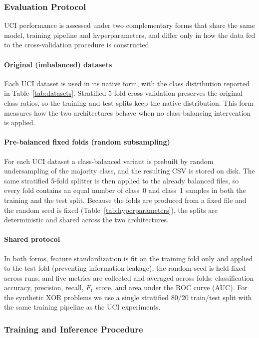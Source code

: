 \documentclass{ieeeaccess}
\begin{document}
\subsubsection{Evaluation Protocol}\label{sec:evalprotocol}

UCI performance is assessed under two complementary forms that share
the same model, training pipeline and hyperparameters, and differ only
in how the data fed to the cross-validation procedure is constructed.

\paragraph{Original (imbalanced) datasets} Each UCI dataset is used
in its native form, with the class distribution reported in
Table~\ref{tab:datasets}. Stratified 5-fold cross-validation preserves the
original class ratios, so the training and test splits keep the native
distribution. This form measures how the two architectures behave
when no class-balancing intervention is applied.

\paragraph{Pre-balanced fixed folds (random subsampling)} For each UCI
dataset a class-balanced variant is prebuilt by random undersampling
of the majority class, and the resulting CSV is stored on disk. The
same stratified 5-fold splitter is then applied to the already balanced
files, so every fold contains an equal number of class~0 and class~1
samples in both the training and the test split. Because the folds are
produced from a fixed file and the random seed is fixed
(Table~\ref{tab:hyperparameters}), the splits are deterministic and
shared across the two architectures.

\paragraph{Shared protocol} In both forms, feature standardization is
fit on the training fold only and applied to the test fold (preventing
information leakage), the random seed is held fixed across runs, and
five metrics are collected and averaged across folds: classification
accuracy, precision, recall, $F_1$ score, and area under the ROC curve
(AUC). For the synthetic XOR problems we use a single stratified 80/20
train/test split with the same training pipeline as the UCI experiments.

\subsubsection{Training and Inference Procedure}\label{sec:training}
\end{document}
